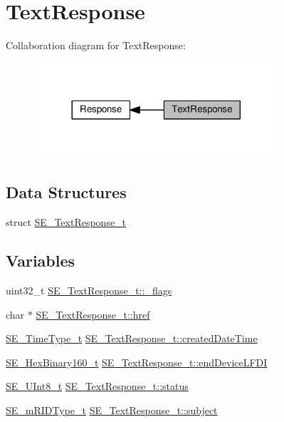 \hypertarget{group__TextResponse}{}\section{Text\+Response}
\label{group__TextResponse}
Collaboration diagram for Text\+Response\+:\nopagebreak
\begin{figure}[H]
\begin{center}
\leavevmode
\includegraphics[width=257pt]{group__TextResponse}
\end{center}
\end{figure}
\subsection*{Data Structures}
\begin{DoxyCompactItemize}
\item 
struct \hyperlink{structSE__TextResponse__t}{S\+E\+\_\+\+Text\+Response\+\_\+t}
\end{DoxyCompactItemize}
\subsection*{Variables}
\begin{DoxyCompactItemize}
\item 
uint32\+\_\+t \hyperlink{group__TextResponse_gacb1bf1b7276dc2a59fed4f769e923a62}{S\+E\+\_\+\+Text\+Response\+\_\+t\+::\+\_\+flags}
\item 
char $\ast$ \hyperlink{group__TextResponse_gaa17772b7549b6e16b7597dc1351bdfda}{S\+E\+\_\+\+Text\+Response\+\_\+t\+::href}
\item 
\hyperlink{group__TimeType_ga6fba87a5b57829b4ff3f0e7638156682}{S\+E\+\_\+\+Time\+Type\+\_\+t} \hyperlink{group__TextResponse_gae6f82efd8b9863fc334ac5e17051c4a6}{S\+E\+\_\+\+Text\+Response\+\_\+t\+::created\+Date\+Time}
\item 
\hyperlink{group__HexBinary160_ga92b92aa55555bdb75f3a59060f2c1632}{S\+E\+\_\+\+Hex\+Binary160\+\_\+t} \hyperlink{group__TextResponse_gaf6d8ec98b273a16ab08cc67d7646c0d3}{S\+E\+\_\+\+Text\+Response\+\_\+t\+::end\+Device\+L\+F\+DI}
\item 
\hyperlink{group__UInt8_gaf7c365a1acfe204e3a67c16ed44572f5}{S\+E\+\_\+\+U\+Int8\+\_\+t} \hyperlink{group__TextResponse_ga80b24a0bd8f2e030d06c5ba2512a1b1a}{S\+E\+\_\+\+Text\+Response\+\_\+t\+::status}
\item 
\hyperlink{group__mRIDType_gac74622112f3a388a2851b2289963ba5e}{S\+E\+\_\+m\+R\+I\+D\+Type\+\_\+t} \hyperlink{group__TextResponse_ga20b727bc040f883df2fcdaf506f859ab}{S\+E\+\_\+\+Text\+Response\+\_\+t\+::subject}
\end{DoxyCompactItemize}


